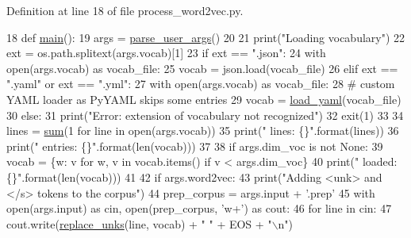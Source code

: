 Definition at line 18 of file process\+\_\+word2vec.\+py.


\begin{DoxyCode}
18 \textcolor{keyword}{def }\hyperlink{namespaceprocess__word2vec_ab3d9c1343a892a23ca1e60230b030dce}{main}():
19     args = \hyperlink{namespaceprocess__word2vec_a104f2b1f7f16fe4bb005d75d662b5407}{parse\_user\_args}()
20 
21     print(\textcolor{stringliteral}{"Loading vocabulary"})
22     ext = os.path.splitext(args.vocab)[1]
23     \textcolor{keywordflow}{if} ext == \textcolor{stringliteral}{".json"}:
24         with open(args.vocab) \textcolor{keyword}{as} vocab\_file:
25             vocab = json.load(vocab\_file)
26     \textcolor{keywordflow}{elif} ext == \textcolor{stringliteral}{".yaml"} \textcolor{keywordflow}{or} ext == \textcolor{stringliteral}{".yml"}:
27         with open(args.vocab) \textcolor{keyword}{as} vocab\_file:
28             \textcolor{comment}{# custom YAML loader as PyYAML skips some entries}
29             vocab = \hyperlink{namespaceprocess__word2vec_a6e39a5dbf33a1c2bb0d4c2354051203f}{load\_yaml}(vocab\_file)
30     \textcolor{keywordflow}{else}:
31         print(\textcolor{stringliteral}{"Error: extension of vocabulary not recognized"})
32         exit(1)
33 
34     lines = \hyperlink{namespacemarian_a460460a6de63beebc5d968b44d49d11b}{sum}(1 \textcolor{keywordflow}{for} line \textcolor{keywordflow}{in} open(args.vocab))
35     print(\textcolor{stringliteral}{"  lines: \{\}"}.format(lines))
36     print(\textcolor{stringliteral}{"  entries: \{\}"}.format(len(vocab)))
37 
38     \textcolor{keywordflow}{if} args.dim\_voc \textcolor{keywordflow}{is} \textcolor{keywordflow}{not} \textcolor{keywordtype}{None}:
39         vocab = \{w: v \textcolor{keywordflow}{for} w, v \textcolor{keywordflow}{in} vocab.items() \textcolor{keywordflow}{if} v < args.dim\_voc\}
40         print(\textcolor{stringliteral}{"  loaded: \{\}"}.format(len(vocab)))
41 
42     \textcolor{keywordflow}{if} args.word2vec:
43         print(\textcolor{stringliteral}{"Adding <unk> and </s> tokens to the corpus"})
44         prep\_corpus = args.input + \textcolor{stringliteral}{'.prep'}
45         with open(args.input) \textcolor{keyword}{as} cin, open(prep\_corpus, \textcolor{stringliteral}{'w+'}) \textcolor{keyword}{as} cout:
46             \textcolor{keywordflow}{for} line \textcolor{keywordflow}{in} cin:
47                 cout.write(\hyperlink{namespaceprocess__word2vec_a0c9fc4391f1004542a2cd02996445980}{replace\_unks}(line, vocab) + \textcolor{stringliteral}{" "} + EOS + \textcolor{stringliteral}{"\(\backslash\)n"})

\end{DoxyCode}
